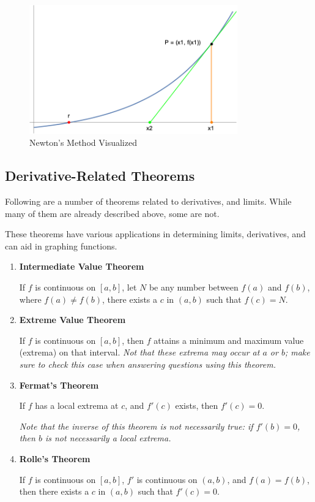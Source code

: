 \documentclass[12pt]{article}
\begin{document}
\begin{figure}[!ht]
    \centering
    \includegraphics[width=9cm]{misc/newtonsmethod.png}
    \caption{Newton's Method Visualized}
    \label{fig:newtonsmethod}
\end{figure}

\subsection{Derivative-Related Theorems}

Following are a number of theorems related to derivatives, and limits. While many of them are already described above, some are not.

These theorems have various applications in determining limits, derivatives, and can aid in graphing functions.

\begin{enumerate}
    \item \textbf{Intermediate Value Theorem}
    
    If $f$ is continuous on $[a,b]$, let $N$ be any number between $f(a)$ and $f(b)$, where $f(a) \neq f(b)$, there exists a $c$ in $(a,b)$ such that $f(c) = N$.
    
    \item \textbf{Extreme Value Theorem}
    
    If $f$ is continuous on $[a,b]$, then $f$ attains a minimum and maximum value (extrema) on that interval. 
    \textit{Not that these extrema may occur at $a$ or $b$; make sure to check this case when answering questions using this theorem.}
    
    \item \textbf{Fermat's Theorem}
    
    If $f$ has a local extrema at $c$, and $f'(c)$ exists, then $f'(c) = 0$. 
    
    \textit{Note that the inverse of this theorem is not necessarily true: if $f'(b) = 0$, then $b$ is not necessarily a local extrema.}
    
    \item \textbf{Rolle's Theorem}
    
    If $f$ is continuous on $[a,b]$, $f'$ is continuous on $(a,b)$, and $f(a) = f(b)$, then there exists a $c$ in $(a,b)$ such that $f'(c) = 0$.
\end{enumerate}
\end{document}
